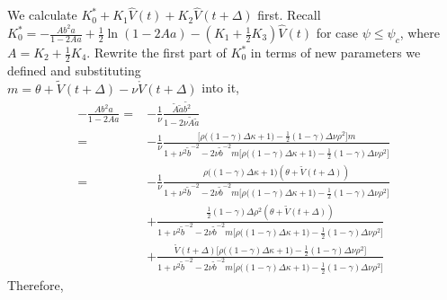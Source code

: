 \documentclass{ws-ijfe}
\begin{document}
We calculate $K_0^*+K_1\hat{V}(t)+K_2\hat{V}(t+\Delta)$ first.
Recall $K_0^*= -\frac{Ab^2a}{1-2Aa}+\frac{1}{2}\ln(1-2Aa)-(K_1+\frac{1}{2}K_3)\hat{V}(t)$ for case $\psi\leq\psi_c$, where $A=K_2+\frac{1}{2}K_4$.
Rewrite the first part of $K_0^*$ in terms of new parameters we defined and substituting \\$m=\theta+\tilde{V}(t+\Delta)-\nu\mathring{V}(t+\Delta)$ into it,
\begin{equation*}
\begin{split}
  -\frac{Ab^2a}{1-2Aa}=&-\frac{1}{\nu}\frac{\tilde{A}\tilde{a}\tilde{b^2}}{1-2\nu\tilde{A}\tilde{a}}\\
  =&-\frac{1}{\nu}\frac{\big[\rho\big((1-\gamma)\Delta\kappa+1\big)-\frac{1}{2}(1-\gamma)\Delta\nu\rho^2\big]m}{1+\nu^2\tilde{b}^{-2}-2\nu\tilde{b}^{-2}m\big[\rho\big((1-\gamma)\Delta\kappa+1\big)-\frac{1}{2}(1-\gamma)\Delta\nu\rho^2\big]}\\
  =&-\frac{1}{\nu}\frac{\rho\big((1-\gamma)\Delta\kappa+1\big)(\theta+\tilde{V}(t+\Delta))}{1+\nu^2\tilde{b}^{-2}-2\nu\tilde{b}^{-2}m\big[\rho\big((1-\gamma)\Delta\kappa+1\big)-\frac{1}{2}(1-\gamma)\Delta\nu\rho^2\big]}\\
  &+\frac{\frac{1}{2}(1-\gamma)\Delta\rho^2(\theta+\tilde{V}(t+\Delta))}{1+\nu^2\tilde{b}^{-2}-2\nu\tilde{b}^{-2}m\big[\rho\big((1-\gamma)\Delta\kappa+1\big)-\frac{1}{2}(1-\gamma)\Delta\nu\rho^2\big]}\\
  &+\frac{\mathring{V}(t+\Delta)\big[\rho\big((1-\gamma)\Delta\kappa+1\big)-\frac{1}{2}(1-\gamma)\Delta\nu\rho^2\big]}{1+\nu^2\tilde{b}^{-2}-2\nu\tilde{b}^{-2}m\big[\rho\big((1-\gamma)\Delta\kappa+1\big)-\frac{1}{2}(1-\gamma)\Delta\nu\rho^2\big]}
\end{split}
\end{equation*}
Therefore,
\end{document}
